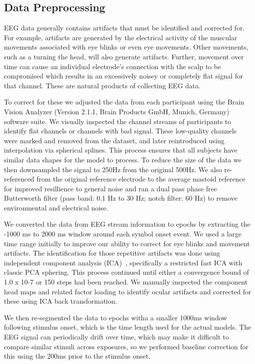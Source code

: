 \subsection{Data Preprocessing}
\label{sec:preprocessing}
EEG data generally contains artifacts that must be identified and corrected 
for. For example, artifacts are generated by the electrical activity of the 
muscular movements associated with eye blinks or even eye movements. Other 
movements, such as a turning the head, will also generate artifacts. Further, 
movement over time can cause an individual electrode's connection with the 
scalp to be compromised which results in an excessively noisey or completely 
flat signal for that channel. These are natural products of collecting EEG 
data. 

To correct for these we adjusted the data from each participant using the Brain 
Vision Analyzer (Version 2.1.1, Brain Products GmbH, Munich, Germany) software 
suite. We visually inspected the channel streams of participants to identify 
flat channels or channels with bad signal. These low-quality channels were 
marked and removed from the dataset, and later reintroduced using interpolation 
via spherical splines. This process ensures that all subjects have similar data 
shapes for the model to process. To reduce the size of the data we then 
downsampled the signal to 250Hz from the original 500Hz. We also re-referenced 
from the original reference electrode to the average mastoid reference for 
improved resillience to general noise and ran a dual pass phase free 
Butterworth filter (pass band: 0.1 Hz to 30 Hz; notch filter: 60 Hz) to remove 
environmental and electrical noise.

We converted the data from EEG stream information to epochs by extracting the 
-1000 ms to 2000 ms window around each symbol onset event. We used a large time 
range initially to improve our ability to correct for eye blinks and movement 
artifacts. The identification for those repetitive artifacts was done using 
independent component analysis (ICA)~\cite{luck2014introduction}, specifically 
a restricted fast ICA with classic PCA sphering. This process continued until 
either a convergence bound of 1.0 x 10-7 or 150 steps had been reached. We 
manually inspected the component head maps and related factor loading to 
identify ocular artifacts and corrected for these using ICA back 
transformation. 

We then re-segmented the data to epochs witha a smaller 1000ms window following 
stimulus onset, which is the time length used for the actual models. The EEG 
signal can periodically drift over time, which may make it difficult to compare 
similar stimuli across exposures, so we performed baseline correction for this 
using the 200ms prior to the stimulus onset. 

